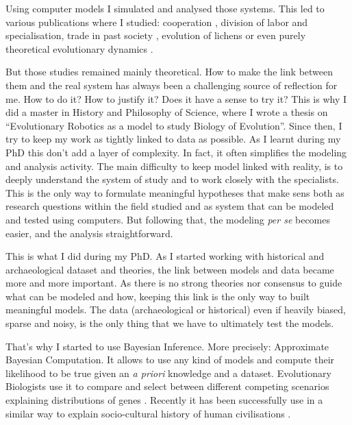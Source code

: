 \documentclass[10pt]{article}
\begin{document}
Using computer models I simulated and analysed those systems. This led to various publications where I studied: cooperation \cite{zibetti2015acaciaesanagentbasedmodelingandsimulationtoolforinvestigatingsocialbehaviorsinresourcelimitedtwodimensionalenvironments}, division of labor and specialisation\cite{montanier2016behavioralspecializationinembodiedevolutionaryroboticswhysodifficult,bredeche2017benefitsofproportionateselectioninembodiedevolutionacasestudywithbehaviouralspecialization}, trade in past society \cite{carrignon2015modelingthecoevolutionoftradeandcultureinpastsocieties}, evolution of lichens \cite{carrignon2016lichen} or even purely theoretical evolutionary dynamics \cite{medernach2015evolutionary,medernach2016evolution}.


But those studies remained mainly theoretical. How to make the link between them and the real system has always been a challenging source of reflection for me.  How to do it? How to justify it? Does it have a sense to try it? This is why I did a  master in History and Philosophy of Science, where I wrote a thesis on ``Evolutionary Robotics as a model to study Biology of Evolution''. Since then, I try to keep my work as tightly linked to data as possible. As I learnt during my PhD this don't add a layer of complexity. In fact, it often simplifies the modeling and analysis activity. The main difficulty to keep model linked with reality, is to deeply understand the system of study and to work closely with the specialists. This is the only way to formulate meaningful hypotheses that make sens both as research questions within the field studied and as system that can be modeled and tested using computers. But following that, the modeling \emph{per se} becomes easier, and the analysis straightforward. 

This is what I did during my PhD. As I started working with historical and archaeological dataset and theories, the link between models and data became more and more important. As there is no strong theories nor consensus to guide what can be modeled and how, keeping this link is the only way to built meaningful models. The data (archaeological or historical) even if heavily biased, sparse and noisy, is the only thing that we have to ultimately test the models.

That's why I started to use Bayesian Inference. More precisely: Approximate Bayesian Computation. It allows to use any kind of models and compute their likelihood to be true given an \emph{a priori} knowledge and a dataset. Evolutionary Biologists use it to compare and select between different competing scenarios explaining distributions of genes \cite{beaumont2009adaptiveapproximatebayesiancomputation}. Recently it has been successfully use in a similar way to explain socio-cultural history of human civilisations \cite{rubiocampillo2016modelselectioninhistoricalresearchusingapproximatebayesiancomputation,kandler2017inferringindividuallevelprocessesfrompopulationlevelpatternsinculturalevolution}.
\end{document}
